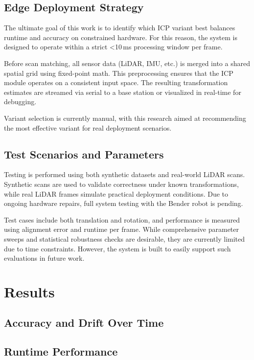 \documentclass[11pt]{article}
\begin{document}
\subsection{Edge Deployment Strategy}

The ultimate goal of this work is to identify which ICP variant best balances runtime and accuracy on constrained hardware. For this reason, the system is designed to operate within a strict \textless10\,ms processing window per frame.

Before scan matching, all sensor data (LiDAR, IMU, etc.) is merged into a shared spatial grid using fixed-point math. This preprocessing ensures that the ICP module operates on a consistent input space. The resulting transformation estimates are streamed via serial to a base station or visualized in real-time for debugging.

Variant selection is currently manual, with this research aimed at recommending the most effective variant for real deployment scenarios.

\subsection{Test Scenarios and Parameters}

Testing is performed using both synthetic datasets and real-world LiDAR scans. Synthetic scans are used to validate correctness under known transformations, while real LiDAR frames simulate practical deployment conditions. Due to ongoing hardware repairs, full system testing with the Bender robot is pending.

Test cases include both translation and rotation, and performance is measured using alignment error and runtime per frame. While comprehensive parameter sweeps and statistical robustness checks are desirable, they are currently limited due to time constraints. However, the system is built to easily support such evaluations in future work.

\section{Results}
\subsection{Accuracy and Drift Over Time}
\subsection{Runtime Performance}
\end{document}
